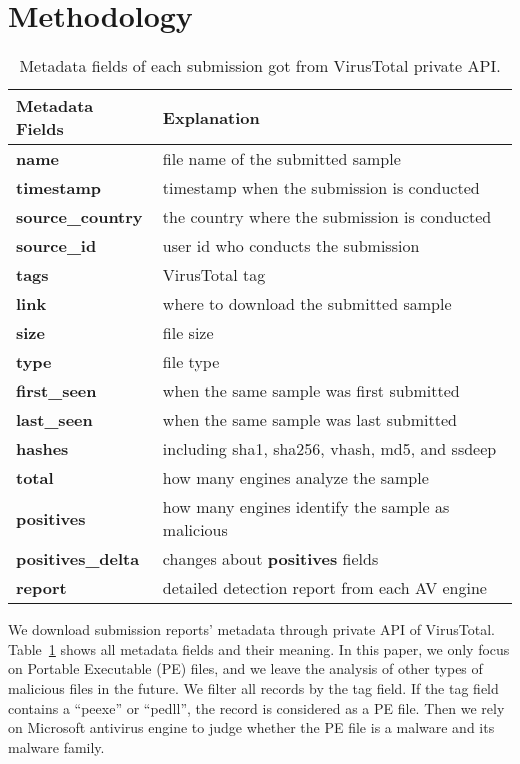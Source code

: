 \section{Methodology}
\label{sec:meth}



\begin{table}[h!]
\centering
\footnotesize
{
\begin{tabular}{l|l}
\hline
Metadata Fields & Explanation \\
\hline                            
{\bf name}      & file name of the submitted sample \\
{\bf timestamp} & timestamp when the submission is conducted \\
{\bf source\_country} & the country where the submission is conducted \\
{\bf source\_id} & user id who conducts the submission\\
{\bf tags} & VirusTotal tag \\
{\bf link} & where to download the submitted sample \\
{\bf size} & file size \\
{\bf type} & file type \\
{\bf first\_seen} & when the same sample was first submitted \\
{\bf last\_seen} & when the same sample was last submitted \\
{\bf hashes} & including sha1, sha256, vhash, md5, and ssdeep\\
{\bf total} & how many engines analyze the sample\\
{\bf positives} & how many engines identify the sample as malicious \\
{\bf positives\_delta} & changes about {\bf positives} fields \\
{\bf report} & detailed detection report from each AV engine \\
\hline

\end{tabular}
}
\caption{Metadata fields of each submission got from VirusTotal private API.}
\label{tab:fields}
\end{table}


We download submission reports' metadata through private API of VirusTotal. 
Table~\ref{tab:fields} shows all metadata fields and their meaning. 
In this paper, we only focus on Portable Executable (PE) files, 
and we leave the analysis of other types of malicious files in the future. 
We filter all records by the tag field. If the tag field contains a ``peexe'' or ``pedll'', the record is considered as a PE file. 
Then we rely on Microsoft antivirus engine to judge whether the PE file is a malware and its malware family.

